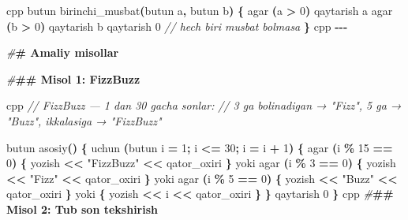 \documentclass[a4paper,11pt,twoside,openright]{book}
\newenvironment{Shaded}{\begin{snugshade}}{\end{snugshade}}
\newcommand{\CommentTok}[1]{\textcolor[rgb]{0.56,0.35,0.01}{\textit{#1}}}
\newcommand{\DecValTok}[1]{\textcolor[rgb]{0.00,0.00,0.81}{#1}}
\newcommand{\ErrorTok}[1]{\textcolor[rgb]{0.64,0.00,0.00}{\textbf{#1}}}
\newcommand{\NormalTok}[1]{#1}
\newcommand{\OperatorTok}[1]{\textcolor[rgb]{0.81,0.36,0.00}{\textbf{#1}}}
\newcommand{\PreprocessorTok}[1]{\textcolor[rgb]{0.56,0.35,0.01}{\textit{#1}}}
\newcommand{\StringTok}[1]{\textcolor[rgb]{0.31,0.60,0.02}{#1}}
\begin{document}
\begin{Shaded}
\begin{Highlighting}[]
\ErrorTok{\textasciigrave{}\textasciigrave{}\textasciigrave{}}\NormalTok{cpp}
\NormalTok{butun birinchi\_musbat}\OperatorTok{(}\NormalTok{butun a}\OperatorTok{,}\NormalTok{ butun b}\OperatorTok{)} \OperatorTok{\{}
\NormalTok{    agar }\OperatorTok{(}\NormalTok{a }\OperatorTok{\textgreater{}} \DecValTok{0}\OperatorTok{)}\NormalTok{ qaytarish a}
\NormalTok{    agar }\OperatorTok{(}\NormalTok{b }\OperatorTok{\textgreater{}} \DecValTok{0}\OperatorTok{)}\NormalTok{ qaytarish b}
\NormalTok{    qaytarish }\DecValTok{0}   \CommentTok{// hech biri musbat bo\textquotesingle{}lmasa}
\OperatorTok{\}}
\ErrorTok{\textasciigrave{}\textasciigrave{}\textasciigrave{}}\NormalTok{cpp}
\OperatorTok{{-}{-}{-}}

\PreprocessorTok{\#}\ErrorTok{\# Amaliy misollar}

\PreprocessorTok{\#}\ErrorTok{\#\# Misol 1: FizzBuzz}

\ErrorTok{\textasciigrave{}\textasciigrave{}\textasciigrave{}}\NormalTok{cpp}
\CommentTok{// FizzBuzz — 1 dan 30 gacha sonlar:}
\CommentTok{// 3 ga bo\textquotesingle{}linadigan → "Fizz", 5 ga → "Buzz", ikkalasiga → "FizzBuzz"}

\NormalTok{butun asosiy}\OperatorTok{()} \OperatorTok{\{}
\NormalTok{    uchun }\OperatorTok{(}\NormalTok{butun i }\OperatorTok{=} \DecValTok{1}\OperatorTok{;}\NormalTok{ i }\OperatorTok{\textless{}=} \DecValTok{30}\OperatorTok{;}\NormalTok{ i }\OperatorTok{=}\NormalTok{ i }\OperatorTok{+} \DecValTok{1}\OperatorTok{)} \OperatorTok{\{}
\NormalTok{        agar }\OperatorTok{(}\NormalTok{i }\OperatorTok{\%} \DecValTok{15} \OperatorTok{==} \DecValTok{0}\OperatorTok{)} \OperatorTok{\{}
\NormalTok{            yozish }\OperatorTok{\textless{}\textless{}} \StringTok{"FizzBuzz"} \OperatorTok{\textless{}\textless{}}\NormalTok{ qator\_oxiri}
        \OperatorTok{\}}\NormalTok{ yoki agar }\OperatorTok{(}\NormalTok{i }\OperatorTok{\%} \DecValTok{3} \OperatorTok{==} \DecValTok{0}\OperatorTok{)} \OperatorTok{\{}
\NormalTok{            yozish }\OperatorTok{\textless{}\textless{}} \StringTok{"Fizz"} \OperatorTok{\textless{}\textless{}}\NormalTok{ qator\_oxiri}
        \OperatorTok{\}}\NormalTok{ yoki agar }\OperatorTok{(}\NormalTok{i }\OperatorTok{\%} \DecValTok{5} \OperatorTok{==} \DecValTok{0}\OperatorTok{)} \OperatorTok{\{}
\NormalTok{            yozish }\OperatorTok{\textless{}\textless{}} \StringTok{"Buzz"} \OperatorTok{\textless{}\textless{}}\NormalTok{ qator\_oxiri}
        \OperatorTok{\}}\NormalTok{ yoki }\OperatorTok{\{}
\NormalTok{            yozish }\OperatorTok{\textless{}\textless{}}\NormalTok{ i }\OperatorTok{\textless{}\textless{}}\NormalTok{ qator\_oxiri}
        \OperatorTok{\}}
    \OperatorTok{\}}
\NormalTok{    qaytarish }\DecValTok{0}
\OperatorTok{\}}
\ErrorTok{\textasciigrave{}\textasciigrave{}\textasciigrave{}}\NormalTok{cpp}
\PreprocessorTok{\#}\ErrorTok{\#\# Misol 2: Tub son tekshirish}


\end{Highlighting}
\end{Shaded}
\end{document}

